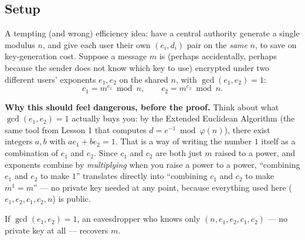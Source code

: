 \subsection{Setup}
A tempting (and wrong) efficiency idea: have a central authority generate a single modulus $n$, and give each user their own $(e_i, d_i)$ pair on the \emph{same} $n$, to save on key-generation cost. Suppose a message $m$ is (perhaps accidentally, perhaps because the sender does not know which key to use) encrypted under two different users' exponents $e_1, e_2$ on the shared $n$, with $\gcd(e_1,e_2)=1$:
\[
c_1 = m^{e_1} \bmod n, \qquad c_2 = m^{e_2} \bmod n.
\]

\medskip\noindent\textbf{Why this should feel dangerous, before the proof.} Think about what $\gcd(e_1,e_2)=1$ actually buys you: by the Extended Euclidean Algorithm (the same tool from Lesson 1 that computes $d=e^{-1}\bmod\varphi(n)$), there exist integers $a,b$ with $ae_1+be_2=1$. That is a way of writing the number $1$ itself as a combination of $e_1$ and $e_2$. Since $c_1$ and $c_2$ are both just $m$ raised to a power, and exponents combine by \emph{multiplying} when you raise a power to a power, ``combining $e_1$ and $e_2$ to make $1$'' translates directly into ``combining $c_1$ and $c_2$ to make $m^1=m$'' — no private key needed at any point, because everything used here ($e_1,e_2,c_1,c_2,n$) is public.

\begin{theorem}
If $\gcd(e_1,e_2)=1$, an eavesdropper who knows only $(n, e_1, e_2, c_1, c_2)$ — no private key at all — recovers $m$.
\end{theorem}

